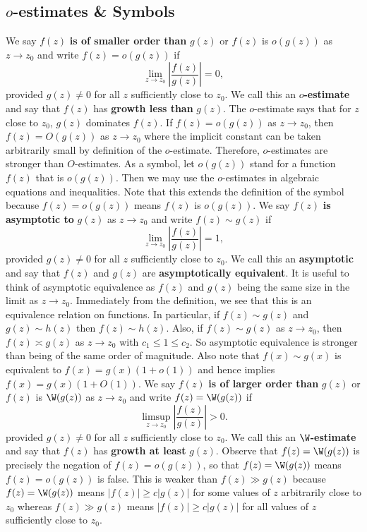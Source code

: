       \subsection*{\texorpdfstring{$o$}{o}-estimates \& Symbols}
        We say $f(z)$ \textbf{is of smaller order than} $g(z)$ or $f(z)$ is $o(g(z))$ as $z \to z_{0}$ and write $f(z) = o(g(z))$ if
        \[
          \lim_{z \to z_{0}}\left|\frac{f(z)}{g(z)}\right| = 0,
        \]
        provided $g(z) \neq 0$ for all $z$ sufficiently close to $z_{0}$. We call this an \textbf{$o$-estimate} and say that $f(z)$ has \textbf{growth less than} $g(z)$. The $o$-estimate says that for $z$ close to $z_{0}$, $g(z)$ dominates $f(z)$. If $f(z) = o(g(z))$ as $z \to z_{0}$, then $f(z) = O(g(z))$ as $z \to z_{0}$ where the implicit constant can be taken arbitrarily small by definition of the $o$-estimate. Therefore, $o$-estimates are stronger than $O$-estimates. As a symbol, let $o(g(z))$ stand for a function $f(z)$ that is $o(g(z))$. Then we may use the $o$-estimates in algebraic equations and inequalities. Note that this extends the definition of the symbol because $f(z) = o(g(z))$ means $f(z)$ is $o(g(z))$. We say $f(z)$ \textbf{is asymptotic to} $g(z)$ as $z \to z_{0}$ and write $f(z) \sim g(z)$ if
        \[
          \lim_{z \to z_{0}}\left|\frac{f(z)}{g(z)}\right| = 1,
        \]
        provided $g(z) \neq 0$ for all $z$ sufficiently close to $z_{0}$. We call this an \textbf{asymptotic} and say that $f(z)$ and $g(z)$ are \textbf{asymptotically equivalent}. It is useful to think of asymptotic equivalence as $f(z)$ and $g(z)$ being the same size in the limit as $z \to z_{0}$. Immediately from the definition, we see that this is an equivalence relation on functions. In particular, if $f(z) \sim g(z)$ and $g(z) \sim h(z)$ then $f(z) \sim h(z)$. Also, if $f(z) \sim g(z)$ as $z \to z_{0}$, then $f(z) \asymp g(z)$ as $z \to z_{0}$ with $c_{1} \le 1 \le c_{2}$. So asymptotic equivalence is stronger than being of the same order of magnitude. Also note that $f(x) \sim g(x)$ is equivalent to $f(x) = g(x)(1+o(1))$ and hence implies $f(x) = g(x)(1+O(1))$. We say $f(z)$ \textbf{is of larger order than} $g(z)$ or $f(z)$ is $\W(g(z))$ as $z \to z_{0}$ and write $f(z) = \W(g(z))$ if
        \[
          \limsup_{z \to z_{0}}\left|\frac{f(z)}{g(z)}\right| > 0.
        \]
        provided $g(z) \neq 0$ for all $z$ sufficiently close to $z_{0}$. We call this an \textbf{$\W$-estimate} and say that $f(z)$ has \textbf{growth at least} $g(z)$. Observe that $f(z) = \W(g(z))$ is precisely the negation of $f(z) = o(g(z))$, so that $f(z) = \W(g(z))$ means $f(z) = o(g(z))$ is false. This is weaker than $f(z) \gg g(z)$ because $f(z) = \W(g(z))$ means $|f(z)| \ge c|g(z)|$ for some values of $z$ arbitrarily close to $z_{0}$ whereas $f(z) \gg g(z)$ means $|f(z)| \ge c|g(z)|$ for all values of $z$ sufficiently close to $z_{0}$.
